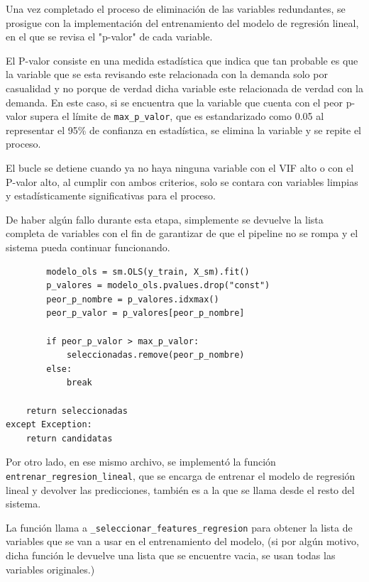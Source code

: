 Una vez completado el proceso de eliminación de las variables redundantes, se prosigue con la implementación del entrenamiento del modelo de regresión lineal, en el que se revisa el "p-valor" de cada variable. 

El P-valor consiste en una medida estadística que indica que tan probable es que la variable que se esta revisando este relacionada con la demanda solo por casualidad y no porque de verdad dicha variable este relacionada de verdad con la demanda. En este caso, si se encuentra que la variable que cuenta con el peor p-valor supera el límite de \texttt{max\_p\_valor}, que es estandarizado como 0.05 al representar el 95\% de confianza en estadística, se elimina la variable y se repite el proceso. 

El bucle se detiene cuando ya no haya ninguna variable con el VIF alto o con el P-valor alto, al cumplir con ambos criterios, solo se contara con variables limpias y estadísticamente significativas para el proceso. 

De haber algún fallo durante esta etapa, simplemente se devuelve la lista completa de variables con el fin de garantizar de que el pipeline no se rompa y el sistema pueda continuar funcionando.

\label{lst:regresion_pvalor}
\begin{verbatim}
        modelo_ols = sm.OLS(y_train, X_sm).fit()
        p_valores = modelo_ols.pvalues.drop("const")
        peor_p_nombre = p_valores.idxmax()
        peor_p_valor = p_valores[peor_p_nombre]

        if peor_p_valor > max_p_valor:
            seleccionadas.remove(peor_p_nombre)
        else:
            break

    return seleccionadas
except Exception:
    return candidatas
\end{verbatim}

Por otro lado, en ese mismo archivo, se implementó la función \texttt{entrenar\_regresion\_lineal}, que se encarga de entrenar el modelo de regresión lineal y devolver las predicciones, también es a la que se llama desde el resto del sistema.

La función llama a \texttt{\_seleccionar\_features\_regresion} para obtener la lista de variables que se van a usar en el entrenamiento del modelo, (si por algún motivo, dicha función le devuelve una lista que se encuentre vacia, se usan todas las variables originales.)

